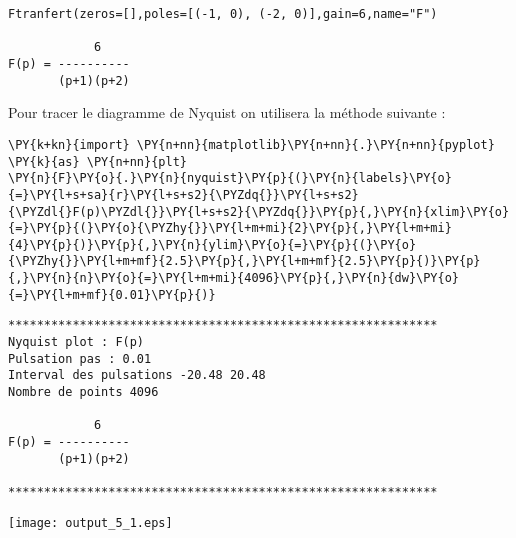     \begin{Verbatim}[commandchars=\\\{\}]
Ftranfert(zeros=[],poles=[(-1, 0), (-2, 0)],gain=6,name="F")

            6
F(p) = ----------
       (p+1)(p+2)

    \end{Verbatim}

    Pour tracer le diagramme de Nyquist on utilisera la méthode suivante :

    \begin{tcolorbox}[breakable, size=fbox, boxrule=1pt, pad at break*=1mm,colback=cellbackground, colframe=cellborder]
\begin{Verbatim}[commandchars=\\\{\}]
\PY{k+kn}{import} \PY{n+nn}{matplotlib}\PY{n+nn}{.}\PY{n+nn}{pyplot} \PY{k}{as} \PY{n+nn}{plt} 
\PY{n}{F}\PY{o}{.}\PY{n}{nyquist}\PY{p}{(}\PY{n}{labels}\PY{o}{=}\PY{l+s+sa}{r}\PY{l+s+s2}{\PYZdq{}}\PY{l+s+s2}{\PYZdl{}F(p)\PYZdl{}}\PY{l+s+s2}{\PYZdq{}}\PY{p}{,}\PY{n}{xlim}\PY{o}{=}\PY{p}{(}\PY{o}{\PYZhy{}}\PY{l+m+mi}{2}\PY{p}{,}\PY{l+m+mi}{4}\PY{p}{)}\PY{p}{,}\PY{n}{ylim}\PY{o}{=}\PY{p}{(}\PY{o}{\PYZhy{}}\PY{l+m+mf}{2.5}\PY{p}{,}\PY{l+m+mf}{2.5}\PY{p}{)}\PY{p}{,}\PY{n}{n}\PY{o}{=}\PY{l+m+mi}{4096}\PY{p}{,}\PY{n}{dw}\PY{o}{=}\PY{l+m+mf}{0.01}\PY{p}{)}
\end{Verbatim}
\end{tcolorbox}

    \begin{Verbatim}[commandchars=\\\{\}]
************************************************************
Nyquist plot : F(p)
Pulsation pas : 0.01
Interval des pulsations -20.48 20.48
Nombre de points 4096

            6
F(p) = ----------
       (p+1)(p+2)

************************************************************
\end{Verbatim}
\begin{center}
    \texttt{[image: output\_5\_1.eps]}
\end{center}
